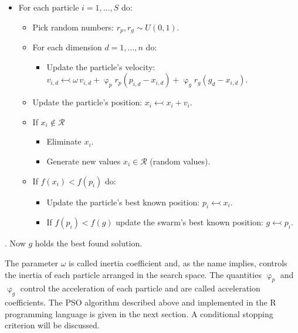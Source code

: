 \documentclass[10pt,letterpaper]{article}
\begin{document}
\begin{itemize}

\item
For each particle $i = 1,\ldots, S$ do:
\begin{itemize}

\item
Pick random numbers: $r_p, r_g \sim U(0,1)$.

\item
For each dimension $d = 1,\ldots, n$ do:
\begin{itemize}

\item
Update the particle's velocity: $v_{i,d} \leftarrowtail \omega \, v_{i,d} + \upvarphi_p r_p (p_{i,d}-x_{i,d}) + \upvarphi_g r_g (g_d-x_{i,d})$.
\end{itemize}

\item
Update the particle's position: $x_i \leftarrowtail x_i + v_i$.

\item
If $x_i \not\in \mathcal{R}$
\begin{itemize}

\item
Eliminate $x_i$.

\item
Generate new values $x_i \in \mathcal{R}$ (random values).

\end{itemize}
\item
If $f(x_i) < f(p_i)$ do:
\begin{itemize}

\item
Update the particle's best known position: $p_i \leftarrowtail x_i$.

\item
If $f(p_i) < f(g)$ update the swarm's best known position: $g \leftarrowtail p_i$.

\end{itemize}

\end{itemize}

\end{itemize}
. Now $g$ holds the best found solution.

The parameter $\omega$ is called inertia coefficient and, as the name implies, controls the inertia of each particle arranged in the search space.
The quantities $\upvarphi_p$ and $\upvarphi_g$ control the acceleration of each particle and are called acceleration coefficients.
The PSO algorithm described
above and implemented in the \textsc{R} programming language is given in the next section.
A conditional stopping criterion will be discussed.
\end{document}
